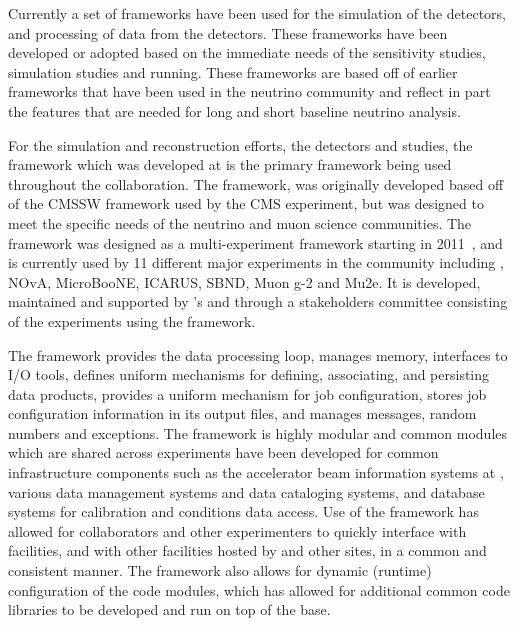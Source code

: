 \documentclass[../main-v1.tex]{subfiles}
\begin{document}
Currently a set of frameworks have been used for the simulation of the  detectors, and processing of data from the  detectors.  These frameworks have been developed or adopted based on the immediate needs of the sensitivity studies, simulation studies and  running.  These frameworks are based off of earlier frameworks that have been used in the neutrino community and reflect in part the features that are needed for long and short baseline neutrino analysis.

For the  simulation and reconstruction efforts, the  detectors and  studies, the  framework which was developed at  is the primary framework being used throughout the collaboration.  The  framework, was originally developed based off of the CMSSW framework used by the CMS experiment, but was designed to meet the specific needs of the neutrino and muon science communities.  The  framework was designed as a multi-experiment framework starting in 2011~\cite{Green:2012gv}, and is currently used by 11 different major experiments in the  community including , NOvA, MicroBooNE, ICARUS, SBND, Muon g-2 and Mu2e.  It is developed, maintained and supported by 's  and through a stakeholders committee consisting of the experiments using the framework.

The framework provides the data processing loop, manages memory, interfaces to I/O tools, defines uniform mechanisms for defining, associating, and persisting data products, provides a uniform mechanism for job configuration, stores job configuration information in its output files, and manages messages, random numbers and exceptions.  The framework is highly modular and common modules which are shared across experiments have been developed for common infrastructure components such as the accelerator beam information systems at , various data management systems and data cataloging systems, and database systems for calibration and conditions data access.  Use of the  framework has allowed for  collaborators and other experimenters to quickly interface with  facilities, and with other facilities hosted by  and other sites, in a common and consistent manner.  The framework also allows for dynamic (runtime) configuration of the code modules, which has allowed for additional common code libraries to be developed and run on top of the  base. 
\end{document}
